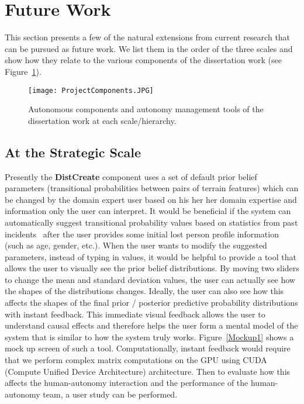 \section{Future Work}
\label{futurework}

This section presents a few of the natural extensions from current research that can be pursued as future work. We list them in the order of the three scales and show how they relate to the various components of the dissertation work (see Figure~\ref{ProjectComponents2}).

\begin{figure}
\centering
\texttt{[image: ProjectComponents.JPG]}
\caption{Autonomous components and autonomy management tools of the dissertation work at each scale/hierarchy.}
\label{ProjectComponents2}
\end{figure}

\subsection{At the Strategic Scale}

Presently the \textbf{DistCreate} component uses a set of default prior belief parameters (transitional probabilities between pairs of terrain features) which can be changed by the domain expert user based on his her her domain expertise and information only the user can interpret. It would be beneficial if the system can automatically suggest transitional probability values based on statistics from past incidents~\cite{Koester2008Lost} after the user provides some initial lost person profile information (such as age, gender, etc.). When the user wants to modify the suggested parameters, instead of typing in values, it would be helpful to provide a tool that allows the user to visually see the prior belief distributions. By moving two sliders to change the mean and standard deviation values, the user can actually see how the shapes of the distributions changes. Ideally, the user can also see how this affects the shapes of the final prior / posterior predictive probability distributions with instant feedback. This immediate visual feedback allows the user to understand causal effects and therefore helps the user form a mental model of the system that is similar to how the system truly works. Figure~\ref{Mockup1} shows a mock up screen of such a tool. Computationally, instant feedback would require that we perform complex matrix computations on the GPU using CUDA (Compute Unified Device Architecture) architecture. Then to evaluate how this affects the human-autonomy interaction and the performance of the human-autonomy team, a user study can be performed.


